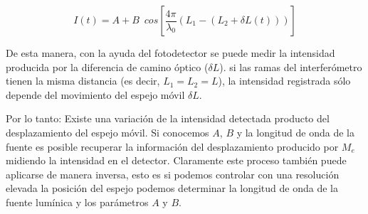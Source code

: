 \begin{equation}
I(t) = A + B \enspace cos[\frac{4 \pi}{\lambda_0} (L_1 - (L_2 + \delta L(t)))]
\end{equation}

De esta manera, con la ayuda del fotodetector se puede medir la intensidad producida por la diferencia de camino óptico ($\delta L$). si las ramas del interferómetro tienen la misma distancia (es decir, $L_1 = L_2 = L$), la intensidad registrada sólo depende del movimiento del espejo móvil $\delta L$.

Por lo tanto: Existe una variación de la intensidad detectada producto del desplazamiento del espejo móvil. Si conocemos $A$, $B$ y la longitud de onda de la fuente es posible recuperar la información del desplazamiento producido por $M_e$ midiendo la intensidad en el detector. Claramente este proceso también puede aplicarse de manera inversa, esto es si podemos controlar con una resolución elevada la posición del espejo podemos determinar la longitud de onda de la fuente lumínica y los parámetros $A$ y $B$.